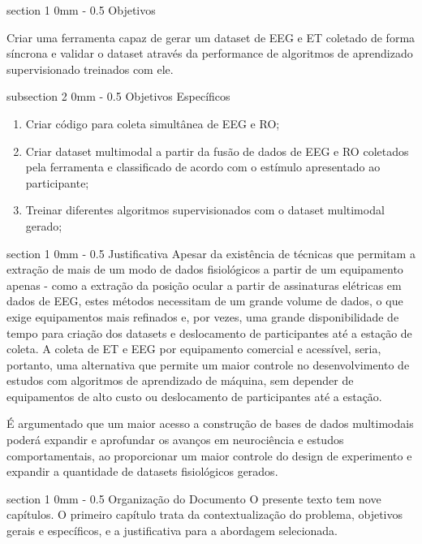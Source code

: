 \documentclass[a4paper, 12pt]{ppgeb}
\makeatletter
\renewcommand{\section}{\@startsection
{section}
{1}
{0mm}
{-\baselineskip}
{0.5\baselineskip}
{\large\bfseries\scshape}}
\renewcommand{\subsection}{\@startsection
{subsection}
{2}
{0mm}
{-\baselineskip}
{0.5\baselineskip}
{\bf\sffamily}}
\makeatother
\begin{document}
\section{Objetivos}

Criar uma ferramenta capaz de gerar um dataset de EEG e ET coletado de forma síncrona e validar o dataset através da performance de algoritmos de aprendizado supervisionado treinados com ele.

\subsection{Objetivos Específicos}

\begin{enumerate}
    \item Criar código para coleta simultânea de EEG e RO;
    \item Criar dataset multimodal a partir da fusão de dados de EEG e RO coletados pela ferramenta e classificado de acordo com o estímulo apresentado ao participante;
    \item Treinar diferentes algoritmos supervisionados com o dataset multimodal gerado;
\end{enumerate}

\section{Justificativa}
Apesar da existência de técnicas que permitam a extração de mais de um modo de dados fisiológicos a partir de um equipamento apenas - como a extração da posição ocular a partir de assinaturas elétricas em dados de EEG, estes métodos necessitam de um grande volume de dados, o que exige equipamentos mais refinados e, por vezes, uma grande disponibilidade de tempo para criação dos datasets e deslocamento de participantes até a estação de coleta. A coleta de ET e EEG por equipamento comercial e acessível, seria, portanto, uma alternativa que permite um maior controle no desenvolvimento de estudos com algoritmos de aprendizado de máquina, sem depender de equipamentos de alto custo ou deslocamento de participantes até a estação. 


É argumentado que um maior acesso a construção de bases de dados multimodais poderá expandir e aprofundar os avanços em neurociência e estudos comportamentais, ao proporcionar um maior controle do design de experimento e expandir a quantidade de datasets fisiológicos gerados. 

\section{Organização do Documento}
O presente texto tem nove capítulos. O primeiro capítulo trata da contextualização do problema, objetivos gerais e específicos, e a justificativa para a abordagem selecionada. 
\end{document}
